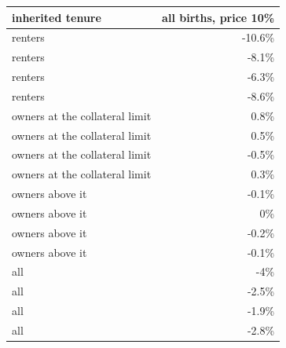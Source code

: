 \begin{tabular}{lr}
\toprule
inherited tenure & all births, price 10\% \\
\midrule
renters & -10.6\% \\
renters & -8.1\% \\
renters & -6.3\% \\
renters & -8.6\% \\
owners at the collateral limit & 0.8\% \\
owners at the collateral limit & 0.5\% \\
owners at the collateral limit & -0.5\% \\
owners at the collateral limit & 0.3\% \\
owners above it & -0.1\% \\
owners above it & 0\% \\
owners above it & -0.2\% \\
owners above it & -0.1\% \\
all & -4\% \\
all & -2.5\% \\
all & -1.9\% \\
all & -2.8\% \\
\bottomrule
\end{tabular}
